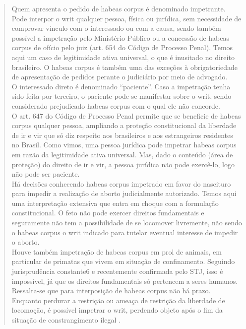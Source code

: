 \documentclass{article}
\begin{document}
\begin{quote}
    Quem apresenta o pedido de habeas corpus é denominado impetrante. Pode interpor o writ qualquer pessoa, física ou jurídica, sem necessidade de comprovar vínculo com o interessado ou com a causa, sendo também possível a impetração pelo Ministério Público ou a concessão de habeas corpus de ofício pelo juiz (art. 654 do Código de Processo Penal). Temos aqui um caso de legitimidade ativa universal, o que é inusitado no direito brasileiro. O habeas corpus é também uma das exceções à obrigatoriedade de apresentação de pedidos perante o judiciário por meio de advogado.\\
    O interessado direto é denominado “paciente”. Caso a impetração tenha sido feita por terceiro, o paciente pode se manifestar sobre o writ, sendo considerado prejudicado habeas corpus com o qual ele não concorde.\\
    O art. 647 do Código de Processo Penal permite que se beneficie de habeas corpus qualquer pessoa, ampliando a proteção constitucional da liberdade de ir e vir que só diz respeito aos brasileiros e aos estrangeiros residentes no Brasil. Como vimos, uma pessoa jurídica pode impetrar habeas corpus em razão da legitimidade ativa universal. Mas, dado o conteúdo (área de proteção) do direito de ir e vir, a pessoa jurídica não pode exercê-lo, logo não pode ser paciente.\\
    Há decisões conhecendo habeas corpus impetrado em favor do nascituro para impedir a realização de aborto judicialmente autorizado. Temos aqui uma interpretação extensiva que entra em choque com a formulação constitucional. O feto não pode exercer direitos fundamentais e seguramente não tem a possibilidade de se locomover livremente, não sendo o habeas corpus o writ indicado para tutelar eventual interesse de impedir o aborto.\\
    Houve também impetração de habeas corpus em prol de animais, em particular de primatas que vivem em situação de confinamento. Seguindo jurisprudência constante6 e recentemente confirmada pelo STJ, isso é impossível, já que os direitos fundamentais só pertencem a seres humanos.\\
    Ressalta-se que para interposição de habeas corpus não há prazo. Enquanto perdurar a restrição ou ameaça de restrição da liberdade de locomoção, é possível impetrar o writ, perdendo objeto após o fim da situação de constrangimento ilegal \cite[pp. 402-403]{dimoulis_curso_2016}.
\end{quote}
\end{document}
